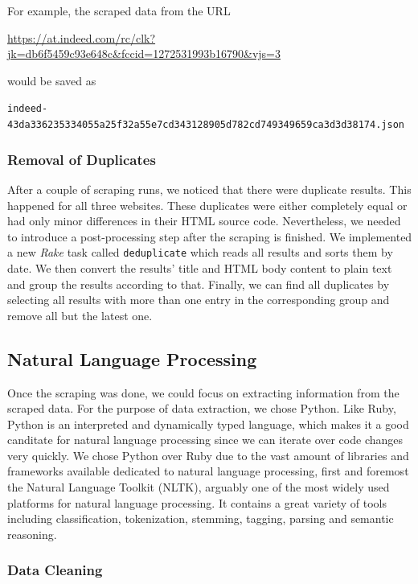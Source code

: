 \documentclass[runningheads]{llncs}
\begin{document}
For example, the scraped data from the URL

\url{https://at.indeed.com/rc/clk?jk=db6f5459c93e648c&fccid=1272531993b16790&vjs=3}

would be saved as

\texttt{indeed-43da336235334055a25f32a55e7cd343128905d782cd749349659ca3d3d38174.json}

\subsubsection{Removal of Duplicates}
\label{subsub:removal_of_duplicates}

After a couple of scraping runs, we noticed that there were duplicate results. This happened for all three websites. These duplicates were either completely equal or had only minor differences in their HTML source code. Nevertheless, we needed to introduce a post-processing step after the scraping is finished. We implemented a new \textit{Rake} task called \texttt{deduplicate} which reads all results and sorts them by date. We then convert the results' title and HTML body content to plain text and group the results according to that. Finally, we can find all duplicates by selecting all results with more than one entry in the corresponding group and remove all but the latest one.

\subsection{Natural Language Processing}
\label{sub:natural_language_processing}

Once the scraping was done, we could focus on extracting information from the scraped data. For the purpose of data extraction, we chose Python. Like Ruby, Python is an interpreted and dynamically typed language, which makes it a good canditate for natural language processing since we can iterate over code changes very quickly. We chose Python over Ruby due to the vast amount of libraries and frameworks available dedicated to natural language processing, first and foremost the Natural Language Toolkit (NLTK), arguably one of the most widely used platforms for natural language processing. It contains a great variety of tools including classification, tokenization, stemming, tagging, parsing and semantic reasoning. \cite{nltk}

\subsubsection{Data Cleaning}
\label{subsub:data_cleaning}
\end{document}

